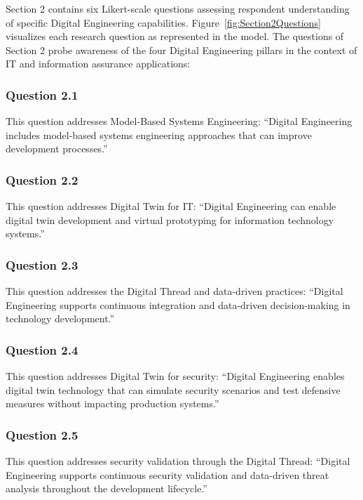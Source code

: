 Section 2 contains six Likert-scale questions assessing respondent understanding of specific Digital Engineering capabilities. Figure~\ref{fig:Section2Questions} visualizes each research question as represented in the model. The questions of Section 2 probe awareness of the four Digital Engineering pillars in the context of IT and information assurance applications:

\subsubsection{Question 2.1}

This question addresses Model-Based Systems Engineering: ``Digital Engineering includes model-based systems engineering approaches that can improve development processes.''

\subsubsection{Question 2.2}

This question addresses Digital Twin for IT: ``Digital Engineering can enable digital twin development and virtual prototyping for information technology systems.''

\subsubsection{Question 2.3}

This question addresses the Digital Thread and data-driven practices: ``Digital Engineering supports continuous integration and data-driven decision-making in technology development.''

\subsubsection{Question 2.4}

This question addresses Digital Twin for security: ``Digital Engineering enables digital twin technology that can simulate security scenarios and test defensive measures without impacting production systems.''

\subsubsection{Question 2.5}

This question addresses security validation through the Digital Thread: ``Digital Engineering supports continuous security validation and data-driven threat analysis throughout the development lifecycle.''

